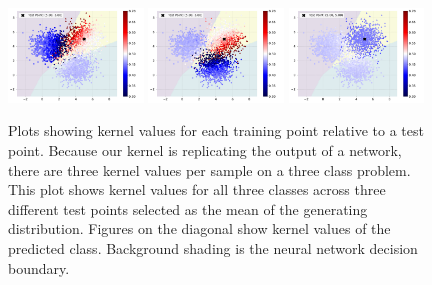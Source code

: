 \begin{figure}[ht]
        \includegraphics[width=0.32\textwidth]{c4_figures/test_kernel_example_class_00_sample_02.pdf}
        \includegraphics[width=0.32\textwidth]{c4_figures/test_kernel_example_class_01_sample_02.pdf}
        \includegraphics[width=0.32\textwidth]{c4_figures/test_kernel_example_class_02_sample_02.pdf}
        \caption{Plots showing kernel values for each training point relative to a test point. Because our kernel is replicating the output of a network, there are three kernel values per sample on a three class problem. This plot shows kernel values for all three classes across three different test points selected as the mean of the generating distribution. Figures on the diagonal show kernel values of the predicted class. Background shading is the neural network decision boundary.}
        \label{fig:points}
    \end{figure}





